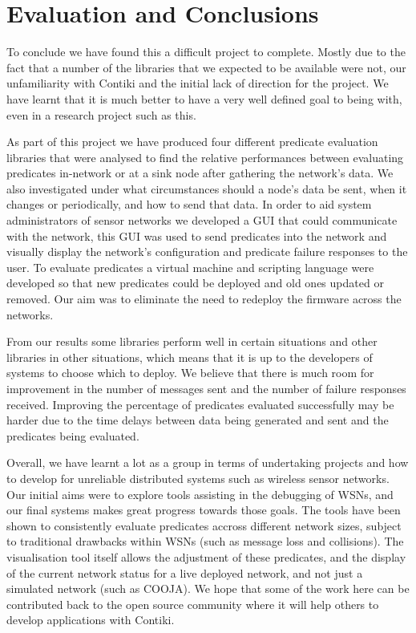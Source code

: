 \section{Evaluation and Conclusions}

To conclude we have found this a difficult project to complete. Mostly due to the fact that a number of the libraries that we expected to be available were not, our unfamiliarity with Contiki and the initial lack of direction for the project. We have learnt that it is much better to have a very well defined goal to being with, even in a research project such as this.

As part of this project we have produced four different predicate evaluation libraries that were analysed to find the relative performances between evaluating predicates in-network or at a sink node after gathering the network's data. We also investigated under what circumstances should a node's data be sent, when it changes or periodically, and how to send that data. In order to aid system administrators of sensor networks we developed a GUI that could communicate with the network, this GUI was used to send predicates into the network and visually display the network's configuration and predicate failure responses to the user. To evaluate predicates a virtual machine and scripting language were developed so that new predicates could be deployed and old ones updated or removed. Our aim was to eliminate the need to redeploy the firmware across the networks.

From our results some libraries perform well in certain situations and other libraries in other situations, which means that it is up to the developers of systems to choose which to deploy. We believe that there is much room for improvement in the number of messages sent and the number of failure responses received. Improving the percentage of predicates evaluated successfully may be harder due to the time delays between data being generated and sent and the predicates being evaluated.

Overall, we have learnt a lot as a group in terms of undertaking projects and how to develop for unreliable distributed systems such as wireless sensor networks. Our initial aims were to explore tools assisting in the debugging of WSNs, and our final systems makes great progress towards those goals. The tools have been shown to consistently evaluate predicates accross different network sizes, subject to traditional drawbacks within WSNs (such as message loss and collisions). The visualisation tool itself allows the adjustment of these predicates, and the display of the current network status for a live deployed network, and not just a simulated network (such as COOJA). We hope that some of the work here can be contributed back to the open source community where it will help others to develop applications with Contiki.

